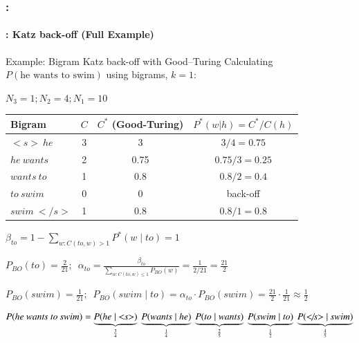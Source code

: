 \documentclass[xcolor=table]{beamer}
\begin{document}
\begin{frame}
	\frametitle{\insertshortsubtitle: \insertsection}
	\framesubtitle{\insertsubsection: Katz back-off (Full Example)}
	
	\vspace{-6pt}
	\begin{exampleblock}{Example: Bigram Katz back-off with Good–Turing}
		\scriptsize\centering
		Calculating $P(\text{he wants to swim})$ using bigrams, $k=1$:
		

		$N_3 = 1; N_2 = 4; N_1 = 10$
		
		\begin{tabular}{lccc}
			\hline
			Bigram & $C$ & $C^*$ (Good-Turing) & $P^*(w|h) = C^*/C(h)$ \\
			\hline
			$<s>\ he$     & 3 & 3     & $3/4 = 0.75$ \\
			$he\ wants$   & 2 & 0.75  & $0.75/3 = 0.25$ \\
			$wants\ to$   & 1 & 0.8   & $0.8/2 = 0.4$ \\
			$to\ swim$    & 0 & 0     & back-off \\
			$swim\ </s>$  & 1 & 0.8     & $0.8/1 = 0.8$ \\
			\hline
		\end{tabular}
		
		
		$\beta_{to} = 1 - \sum_{w: C(to,w) > 1} P^*(w \mid to) = 1$
		
		
		$P_{BO}(to) = \frac{2}{21}; \,\,\, \alpha_{to} = \frac{\beta_{to}}{\sum_{w: C(to,w) \le 1} P_{BO}(w)} = \frac{1}{2/21} = \frac{21}{2}$
		
		
		$P_{BO}(swim) = \frac{1}{21}; \,\,\, P_{BO}(swim \mid to) = \alpha_{to} \cdot P_{BO}(swim) = \frac{21}{2} \cdot \frac{1}{21} \approx \frac{1}{2}$
		
		
		\[
		P(\text{\textit{he wants to swim}}) = 
		\underbrace{P(\textit{he} \mid \textit{\textless s\textgreater})}_{\frac{3}{4}}\ 
		\underbrace{P(\textit{wants} \mid \textit{he})}_{\frac{1}{4}}\ 
		\underbrace{P(\textit{to} \mid \textit{wants})}_{\frac{2}{5}}\ 
		\underbrace{P(\textit{swim} \mid \textit{to})}_{\frac{1}{2}}\ 
		\underbrace{P(\textit{\textless/s\textgreater} \mid \textit{swim})}_{\frac{4}{5}} 
		\]
		
	\end{exampleblock}
	
\end{frame}
\end{document}
